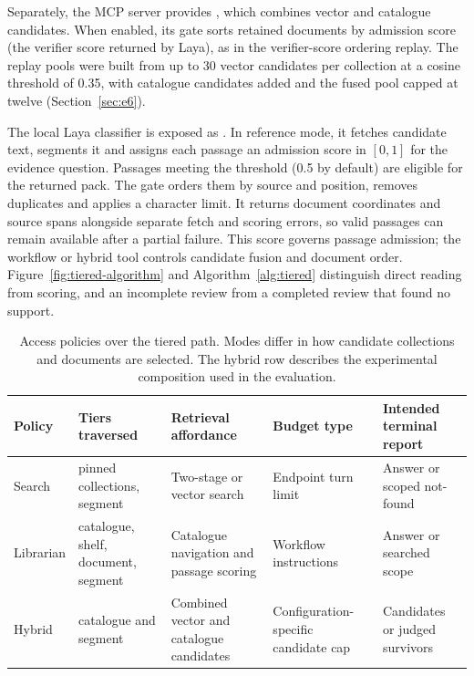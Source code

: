 Separately, the MCP server provides , which combines
vector and catalogue candidates. When enabled, its gate sorts retained
documents by admission score (the verifier score returned by Laya), as in the
verifier-score ordering replay. The replay pools were built from up to 30 vector candidates per collection at a
cosine threshold of 0.35, with catalogue candidates added and the fused pool
capped at twelve (Section~\ref{sec:e6}).

The local Laya classifier \cite{laya} is exposed as
. In reference mode, it fetches candidate text, segments
it and assigns each passage an admission score in $[0,1]$ for the evidence
question. Passages meeting the threshold (0.5 by default) are eligible for
the returned pack. The gate orders them by source and position, removes
duplicates and applies a character limit. It returns document coordinates
and source spans alongside separate fetch and scoring errors, so valid
passages can remain available after a partial failure. This score governs
passage admission; the workflow or hybrid tool controls candidate fusion
and document order. Figure~\ref{fig:tiered-algorithm} and
Algorithm~\ref{alg:tiered} distinguish direct reading from scoring, and an
incomplete review from a completed review that found no support.

\begin{table}[t]
\centering
\small
\setlength{\tabcolsep}{5pt}
\caption{Access policies over the tiered path. Modes differ in how candidate collections and documents are selected.
The hybrid row describes the experimental composition used in the evaluation.}
\label{tab:lanes}
\begin{tabular}{@{}>{\raggedright\arraybackslash}p{}>{\raggedright\arraybackslash}p{}>{\raggedright\arraybackslash}p{}>{\raggedright\arraybackslash}p{}>{\raggedright\arraybackslash}p{}@{}}
\toprule
Policy & Tiers traversed & Retrieval affordance & Budget type & Intended terminal report\\
\midrule
Search & pinned collections, segment & Two-stage or vector search & Endpoint turn limit & Answer or scoped not-found\\
Librarian & catalogue, shelf, document, segment & Catalogue navigation and passage scoring & Workflow instructions & Answer or searched scope\\
Hybrid & catalogue and segment & Combined vector and catalogue candidates & Configuration-specific candidate cap & Candidates or judged survivors\\
\bottomrule
\end{tabular}
\end{table}

